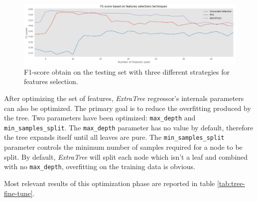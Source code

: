 \begin{figure}[htbp]
    \centering
    \includegraphics[width=15cm]{images/feature_selection.png}
    \caption[F1-score based on feature selection]{F1-score obtain on the testing set with three different strategies for features selection.}
    \label{fig:feature-selection}
\end{figure}


After optimizing the set of features, \textit{ExtraTree} regressor's internals parameters can also be optimized. The primary goal is to reduce the overfitting produced by the tree. Two parameters have been optimized: \texttt{max\_depth} and \texttt{min\_samples\_split}. The \texttt{max\_depth} parameter has no value by default, therefore the tree expands itself until all leaves are pure. The \texttt{min\_samples\_split} parameter controls the minimum number of samples required for a node to be split. By default, \textit{ExtraTree} will split each node which isn't a leaf and combined with no \texttt{max\_depth}, overfitting on the training data is obvious. 

Most relevant results of this optimization phase are reported in table \ref{tab:tree-fine-tune}.

